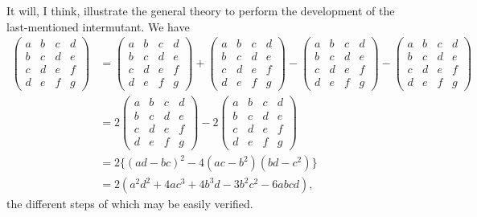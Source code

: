 \documentclass[11pt,a4paper]{article}
\theoremstyle{plain}
\begin{document}
It will, I think, illustrate the general theory to perform the development of the last-mentioned intermutant. We have
\begin{align*}
\begin{pmatrix} a & b & c & d \\ b & c & d & e \\ c & d & e & f \\ d & e & f & g \end{pmatrix} &= \begin{pmatrix} a & b & c & d \\ b & c & d & e \\ c & d & e & f \\ d & e & f & g \end{pmatrix} + \begin{pmatrix} a & b & c & d \\ b & c & d & e \\ c & d & e & f \\ d & e & f & g \end{pmatrix} - \begin{pmatrix} a & b & c & d \\ b & c & d & e \\ c & d & e & f \\ d & e & f & g \end{pmatrix} - \begin{pmatrix} a & b & c & d \\ b & c & d & e \\ c & d & e & f \\ d & e & f & g \end{pmatrix} \\
&= 2 \begin{pmatrix} a & b & c & d \\ b & c & d & e \\ c & d & e & f \\ d & e & f & g \end{pmatrix} - 2 \begin{pmatrix} a & b & c & d \\ b & c & d & e \\ c & d & e & f \\ d & e & f & g \end{pmatrix} \\
&= 2\{(ad - bc)^2 - 4(ac - b^2)(bd - c^2)\} \\
&= 2(a^2d^2 + 4ac^3 + 4b^3d - 3b^2c^2 - 6abcd),
\end{align*}
the different steps of which may be easily verified.
\end{document}
